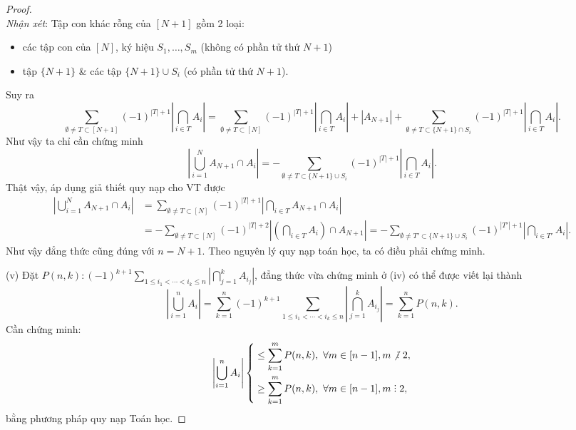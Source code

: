 \documentclass[oneside]{book}
\DeclareRobustCommand{\divby}{%
	\mathrel{\vbox{\baselineskip.65ex\lineskiplimit0pt\hbox{.}\hbox{.}\hbox{.}}}%
}
\begin{document}
\begin{proof}
\begin{equation*}
	\end{equation*}
	{\it Nhận xét}: Tập con khác rỗng của $[N + 1]$ gồm 2 loại:
	\begin{itemize}
		\item các tập con của $[N]$, ký hiệu $S_1,\ldots,S_m$ (không có phần tử thứ $N + 1$)
		\item tập $\{N + 1\}$ \& các tập $\{N + 1\}\cup S_i$ (có phần tử thứ $N + 1$).
	\end{itemize}
	Suy ra
	\begin{equation*}
		\sum_{\emptyset\ne T\subset[N + 1]} (-1)^{|T| + 1}\left|\bigcap_{i\in T} A_i\right| = \sum_{\emptyset\ne T\subset[N]} (-1)^{|T| + 1}\left|\bigcap_{i\in T} A_i\right| + |A_{N+1}| + \sum_{\emptyset\ne T\subset\{N + 1\}\cap S_i} (-1)^{|T| + 1}\left|\bigcap_{i\in T} A_i\right|.
	\end{equation*}
	Như vậy ta chỉ cần chứng minh
	\begin{equation*}
		\left|\bigcup_{i=1}^N A_{N+1}\cap A_i\right| = -\sum_{\emptyset\ne T\subset\{N + 1\}\cup S_i} (-1)^{|T| + 1}\left|\bigcap_{i\in T} A_i\right|.
	\end{equation*}
	Thật vậy, áp dụng giả thiết quy nạp cho VT được
	\begin{align*}
		\left|\bigcup_{i=1}^N A_{N+1}\cap A_i\right| &= \sum_{\emptyset\ne T\subset[N]} (-1)^{|T| + 1}\left|\bigcap_{i\in T} A_{N+1}\cap A_i\right|\\
		&= -\sum_{\emptyset\ne T\subset[N]} (-1)^{|T| + 2}\left|\left(\bigcap_{i\in T} A_i\right)\cap A_{N+1}\right| = -\sum_{\emptyset\ne T'\subset\{N + 1\}\cup S_i} (-1)^{|T'| + 1}\left|\bigcap_{i\in T'} A_i\right|.
	\end{align*}
	Như vậy đẳng thức cũng đúng với $n = N + 1$. Theo nguyên lý quy nạp toán học, ta có điều phải chứng minh.
	\item(v) Đặt $P(n,k)\colon(-1)^{k+1}\sum_{1\le i_1 < \cdots < i_k\le n} \left|\bigcap_{j=1}^k A_{i_j}\right|$, đẳng thức vừa chứng minh ở (iv) có thể được viết lại thành
	\begin{equation*}
		\left|\bigcup_{i=1}^n A_i\right| = \sum_{k=1}^n (-1)^{k+1}\sum_{1\le i_1 < \cdots < i_k\le n} \left|\bigcap_{j=1}^k A_{i_j}\right| = \sum_{k=1}^n P(n,k).
	\end{equation*}
	Cần chứng minh:
	\begin{equation*}
		\left|\bigcup_{i=1}^n A_i\right|\left\{\begin{split}
			&\le\sum_{k=1}^m P(n,k),\ \forall m\in[n-1],m\not{\divby}\ 2,\\
			&\ge\sum_{k=1}^m P(n,k),\ \forall m\in[n-1],m\divby2,\\
		\end{split}\right.
	\end{equation*}
	bằng phương pháp quy nạp Toán học.
\end{proof}
\end{document}
